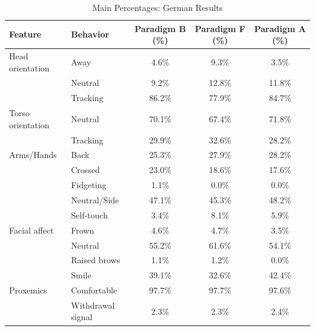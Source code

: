 \begin{table}[ht]
\centering
\caption{Main Percentages: German Results}
\label{tab:main_pct_german}
\begin{tabular}{llccc}
\toprule
Feature & Behavior & Paradigm B (\%) & Paradigm F (\%) & Paradigm A (\%) \\
\midrule
Head orientation & Away & 4.6\% & 9.3\% & 3.5\% \\
~ & Neutral & 9.2\% & 12.8\% & 11.8\% \\
~ & Tracking & 86.2\% & 77.9\% & 84.7\% \\
\midrule
Torso orientation & Neutral & 70.1\% & 67.4\% & 71.8\% \\
~ & Tracking & 29.9\% & 32.6\% & 28.2\% \\
\midrule
Arms/Hands & Back & 25.3\% & 27.9\% & 28.2\% \\
~ & Crossed & 23.0\% & 18.6\% & 17.6\% \\
~ & Fidgeting & 1.1\% & 0.0\% & 0.0\% \\
~ & Neutral/Side & 47.1\% & 45.3\% & 48.2\% \\
~ & Self-touch & 3.4\% & 8.1\% & 5.9\% \\
\midrule
Facial affect & Frown & 4.6\% & 4.7\% & 3.5\% \\
~ & Neutral & 55.2\% & 61.6\% & 54.1\% \\
~ & Raised brows & 1.1\% & 1.2\% & 0.0\% \\
~ & Smile & 39.1\% & 32.6\% & 42.4\% \\
\midrule
Proxemics & Comfortable & 97.7\% & 97.7\% & 97.6\% \\
~ & Withdrawal signal & 2.3\% & 2.3\% & 2.4\% \\
\bottomrule
\end{tabular}
\end{table}